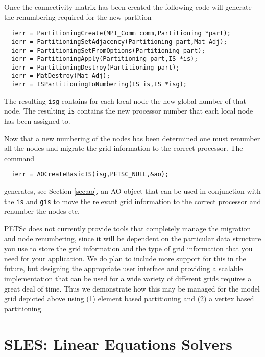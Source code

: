 Once the connectivity matrix has been created the following code will generate the 
renumbering required for the new partition
\begin{verbatim}
  ierr = PartitioningCreate(MPI_Comm comm,Partitioning *part);
  ierr = PartitioningSetAdjacency(Partitioning part,Mat Adj);
  ierr = PartitioningSetFromOptions(Partitioning part);
  ierr = PartitioningApply(Partitioning part,IS *is);
  ierr = PartitioningDestroy(Partitioning part); 
  ierr = MatDestroy(Mat Adj);
  ierr = ISPartitioningToNumbering(IS is,IS *isg);
\end{verbatim}
The   
  
  resulting {\tt isg} contains for each local node the new global
number of that node. The resulting {\tt is} contains the new processor number
that each local node has been assigned to.

Now that a new numbering of the nodes has been determined one must 
renumber all the nodes and migrate the grid information to the correct processor.
The command
\begin{verbatim}
  ierr = AOCreateBasicIS(isg,PETSC_NULL,&ao);
\end{verbatim}
generates, see Section \ref{sec:ao}, an AO object that can be used in conjunction with the
{\tt is} and {\tt gis} to move the relevant grid information to the correct processor
and renumber the nodes etc. 

PETSc does not currently provide tools that completely manage the migration and 
node renumbering, since it will be dependent on the particular data structure you 
use to store the grid information and the type of grid information that you need
for your application. We do plan to include more support for this in the future,
but designing the appropriate user interface and providing a scalable implementation
that can be used for a wide variety of different grids requires a great deal of time.
Thus we demonstrate how this may be managed for the model
grid depicted above using (1) element based partitioning and (2) a vertex based 
partitioning. 



 


\chapter{SLES: Linear Equations Solvers} 
\label{ch:sles}

